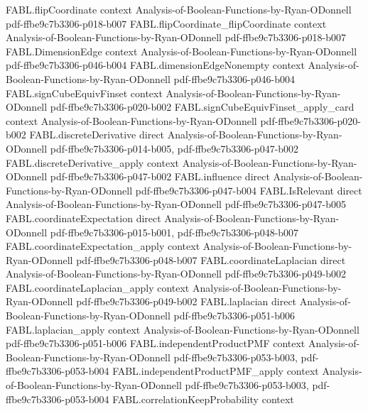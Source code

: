 \begin{theorem}
\proofstep
  {FABL.flipCoordinate}
  {context}
  {Analysis-of-Boolean-Functions-by-Ryan-ODonnell}
  {pdf-ffbe9c7b3306-p018-b007}
\proofstep
  {FABL.flipCoordinate_flipCoordinate}
  {context}
  {Analysis-of-Boolean-Functions-by-Ryan-ODonnell}
  {pdf-ffbe9c7b3306-p018-b007}
\proofstep
  {FABL.DimensionEdge}
  {context}
  {Analysis-of-Boolean-Functions-by-Ryan-ODonnell}
  {pdf-ffbe9c7b3306-p046-b004}
\proofstep
  {FABL.dimensionEdgeNonempty}
  {context}
  {Analysis-of-Boolean-Functions-by-Ryan-ODonnell}
  {pdf-ffbe9c7b3306-p046-b004}
\proofstep
  {FABL.signCubeEquivFinset}
  {context}
  {Analysis-of-Boolean-Functions-by-Ryan-ODonnell}
  {pdf-ffbe9c7b3306-p020-b002}
\proofstep
  {FABL.signCubeEquivFinset_apply_card}
  {context}
  {Analysis-of-Boolean-Functions-by-Ryan-ODonnell}
  {pdf-ffbe9c7b3306-p020-b002}
\proofstep
  {FABL.discreteDerivative}
  {direct}
  {Analysis-of-Boolean-Functions-by-Ryan-ODonnell}
  {pdf-ffbe9c7b3306-p014-b005,
    pdf-ffbe9c7b3306-p047-b002}
\proofstep
  {FABL.discreteDerivative_apply}
  {context}
  {Analysis-of-Boolean-Functions-by-Ryan-ODonnell}
  {pdf-ffbe9c7b3306-p047-b002}
\proofstep
  {FABL.influence}
  {direct}
  {Analysis-of-Boolean-Functions-by-Ryan-ODonnell}
  {pdf-ffbe9c7b3306-p047-b004}
\proofstep
  {FABL.IsRelevant}
  {direct}
  {Analysis-of-Boolean-Functions-by-Ryan-ODonnell}
  {pdf-ffbe9c7b3306-p047-b005}
\proofstep
  {FABL.coordinateExpectation}
  {direct}
  {Analysis-of-Boolean-Functions-by-Ryan-ODonnell}
  {pdf-ffbe9c7b3306-p015-b001,
    pdf-ffbe9c7b3306-p048-b007}
\proofstep
  {FABL.coordinateExpectation_apply}
  {context}
  {Analysis-of-Boolean-Functions-by-Ryan-ODonnell}
  {pdf-ffbe9c7b3306-p048-b007}
\proofstep
  {FABL.coordinateLaplacian}
  {direct}
  {Analysis-of-Boolean-Functions-by-Ryan-ODonnell}
  {pdf-ffbe9c7b3306-p049-b002}
\proofstep
  {FABL.coordinateLaplacian_apply}
  {context}
  {Analysis-of-Boolean-Functions-by-Ryan-ODonnell}
  {pdf-ffbe9c7b3306-p049-b002}
\proofstep
  {FABL.laplacian}
  {direct}
  {Analysis-of-Boolean-Functions-by-Ryan-ODonnell}
  {pdf-ffbe9c7b3306-p051-b006}
\proofstep
  {FABL.laplacian_apply}
  {context}
  {Analysis-of-Boolean-Functions-by-Ryan-ODonnell}
  {pdf-ffbe9c7b3306-p051-b006}
\proofstep
  {FABL.independentProductPMF}
  {context}
  {Analysis-of-Boolean-Functions-by-Ryan-ODonnell}
  {pdf-ffbe9c7b3306-p053-b003,
    pdf-ffbe9c7b3306-p053-b004}
\proofstep
  {FABL.independentProductPMF_apply}
  {context}
  {Analysis-of-Boolean-Functions-by-Ryan-ODonnell}
  {pdf-ffbe9c7b3306-p053-b003,
    pdf-ffbe9c7b3306-p053-b004}
\proofstep
  {FABL.correlationKeepProbability}
  {context}

\end{theorem}
